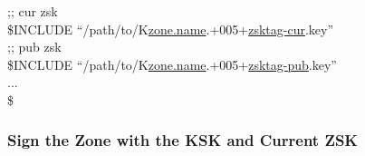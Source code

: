 \begin{tabbing}
\hspace{0.5in};; cur zsk \\
\hspace{0.5in}\$INCLUDE ``/path/to/K\underline{zone.name}.+005+\underline{zsktag-cur}.key'' \\
\hspace{0.5in};; pub zsk \\
\hspace{0.5in}\$INCLUDE ``/path/to/K\underline{zone.name}.+005+\underline{zsktag-pub}.key'' \\
\hspace{0.5in}... \\
\hspace{0.5in}\$ \\
\end{tabbing}


\subsubsection{Sign the Zone with the KSK and Current ZSK}







